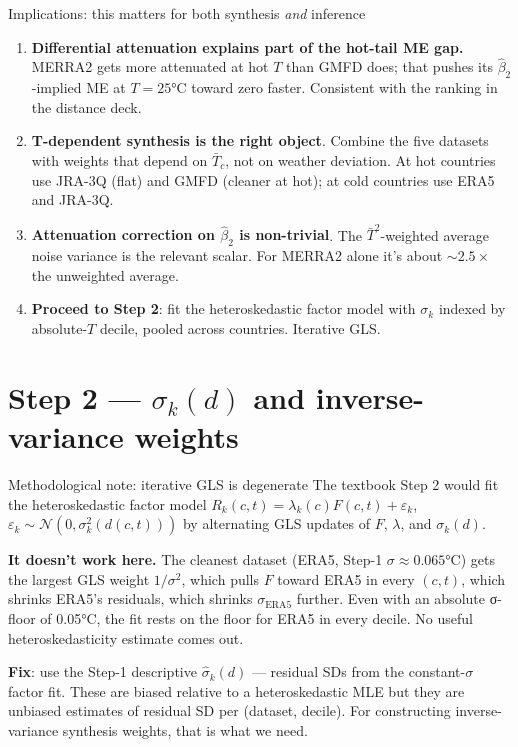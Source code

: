\documentclass[10pt,aspectratio=169]{beamer}
\begin{document}
\begin{frame}{Implications: this matters for both synthesis \emph{and} inference}
  \begin{enumerate}
    \item \textbf{Differential attenuation explains part of the hot-tail ME gap.}
          MERRA2 gets more attenuated at hot $T$ than GMFD does; that
          pushes its $\hat\beta_2$-implied ME at $T = 25$°C toward zero
          faster. Consistent with the ranking in the distance deck.
    \item \textbf{T-dependent synthesis is the right object}. Combine the
          five datasets with weights that depend on $\bar T_c$, not
          on weather deviation. At hot countries use JRA-3Q (flat) and
          GMFD (cleaner at hot); at cold countries use ERA5 and JRA-3Q.
    \item \textbf{Attenuation correction on $\hat\beta_2$ is non-trivial}.
          The $\bar T^2$-weighted average noise variance is the relevant
          scalar. For MERRA2 alone it's about $\sim 2.5\times$ the
          unweighted average.
    \item \textbf{Proceed to Step 2}: fit the heteroskedastic factor model
          with $\sigma_k$ indexed by absolute-$T$ decile, pooled across
          countries. Iterative GLS.
  \end{enumerate}
\end{frame}

\section{Step 2 — $\sigma_k(d)$ and inverse-variance weights}

\begin{frame}{Methodological note: iterative GLS is degenerate}
  The textbook Step 2 would fit the heteroskedastic factor model
  $R_k(c,t) = \lambda_k(c)F(c,t) + \varepsilon_k$,
  $\varepsilon_k \sim \mathcal N(0, \sigma_k^2(d(c,t)))$
  by alternating GLS updates of $F$, $\lambda$, and $\sigma_k(d)$.

  \vspace{0.4em}
  \textbf{It doesn't work here.} The cleanest dataset (ERA5, Step-1
  $\sigma \approx 0.065$°C) gets the largest GLS weight $1/\sigma^2$, which
  pulls $F$ toward ERA5 in every $(c,t)$, which shrinks ERA5's residuals,
  which shrinks $\sigma_{\text{ERA5}}$ further. Even with an absolute σ-floor
  of 0.05°C, the fit rests on the floor for ERA5 in every decile. No useful
  heteroskedasticity estimate comes out.

  \vspace{0.4em}
  \textbf{Fix}: use the Step-1 descriptive $\hat\sigma_k(d)$ --- residual
  SDs from the constant-$\sigma$ factor fit. These are biased relative to
  a heteroskedastic MLE but they are unbiased estimates of residual SD per
  (dataset, decile). For constructing inverse-variance synthesis weights,
  that is what we need.
\end{frame}
\end{document}
